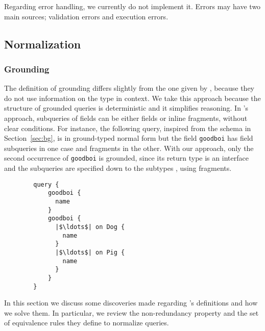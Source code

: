 Regarding error handling, we currently do not implement it. Errors may have two main sources; validation errors and execution errors.



\subsection{Normalization}


\subsubsection{Grounding}
The \gcoql definition of grounding differs slightly from the one given by \HP, because they do not use information on the type in context. We take this approach because the structure of grounded queries is deterministic and it simplifies reasoning. In \HP's approach, subqueries of fields can be either fields or inline fragments, without clear conditions. For instance, the following query, inspired from the schema in Section~\ref{sec:bg}, is in ground-typed normal form but the field \texttt{goodboi} has field subqueries in one case and fragments in the other. With our approach, only the second occurrence of \texttt{goodboi} is grounded, since its return type is an interface and the subqueries are specified down to the subtypes , using fragments.

\begin{verbatim}
        query {
            goodboi {
              name
            }
            goodboi {
              |$\ldots$| on Dog {
                name
              }
              |$\ldots$| on Pig {
                name
              }
            }
        }
\end{verbatim}

In this section we discuss some discoveries made regarding \HP's definitions and how we solve them. In particular, we review the non-redundancy property and the set of equivalence rules they define to normalize queries.


